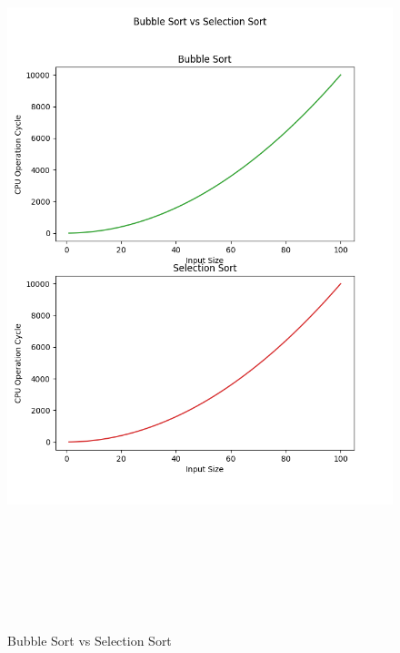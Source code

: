 \documentclass{article}
\begin{document}
\begin{figure}[h]
    \centerline{\includegraphics[width=7in,height=8.5in]{Bubble Sort_Selection Sort.png}}
    \caption{Bubble Sort vs Selection Sort}
\end{figure}
\end{document}
